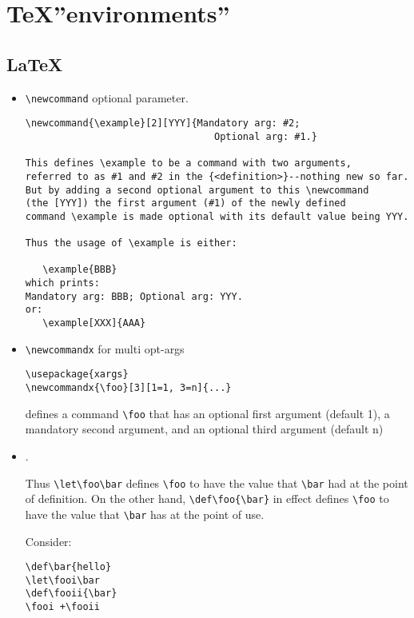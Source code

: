 \section{\TeX ''environments''}

\subsection{\LaTeX}

\begin{itemize}

\item \verb=\newcommand= optional parameter.

\begin{lstlisting}
\newcommand{\example}[2][YYY]{Mandatory arg: #2;
                                 Optional arg: #1.}

This defines \example to be a command with two arguments, 
referred to as #1 and #2 in the {<definition>}--nothing new so far. 
But by adding a second optional argument to this \newcommand 
(the [YYY]) the first argument (#1) of the newly defined 
command \example is made optional with its default value being YYY.

Thus the usage of \example is either:

   \example{BBB}
which prints:
Mandatory arg: BBB; Optional arg: YYY.
or:
   \example[XXX]{AAA}
\end{lstlisting}

\item \verb=\newcommandx= for multi opt-args

\begin{lstlisting}
\usepackage{xargs}
\newcommandx{\foo}[3][1=1, 3=n]{...}
\end{lstlisting}

defines a command \verb=\foo= that has an optional first argument (default 1), a mandatory second argument, and an optional third argument (default n)

\item {}.

Thus \verb=\let\foo\bar= defines \verb=\foo= to have the value that \verb=\bar= had at the point of definition. On the other hand, \verb=\def\foo{\bar}= in effect defines \verb=\foo= to have the value that \verb=\bar= has at the point of use.

Consider:

\begin{verbatim}
\def\bar{hello}
\let\fooi\bar
\def\fooii{\bar}
\fooi +\fooii


\end{verbatim}
\end{itemize}
